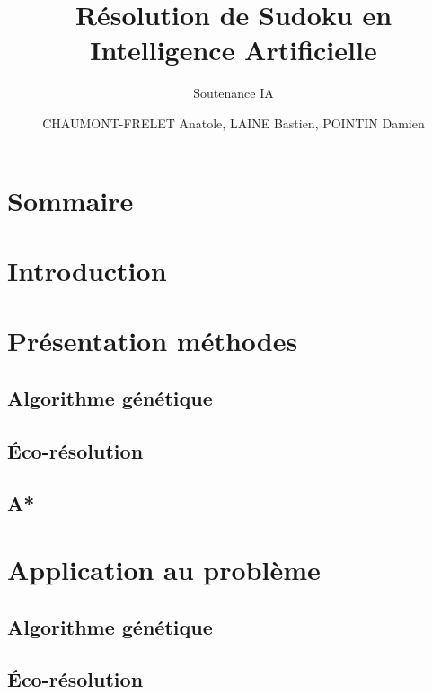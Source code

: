 \documentclass{beamer}
\title{Résolution de Sudoku en Intelligence Artificielle}
\subtitle{Soutenance IA}
\author{CHAUMONT-FRELET Anatole, LAINE Bastien, POINTIN Damien}
\institute{Génie Mathématique | INSA Rouen}
\begin{document}
    \beamertemplatenavigationsymbolsempty

    \begin{frame}
        \titlepage{}
    \end{frame}

    \section*{Sommaire}
        \begin{frame}
            \tableofcontents
        \end{frame}

    \section{Introduction}
        \subsection{}
            

    \section{Présentation méthodes}
        \subsection{Algorithme génétique}
            
        \subsection{Éco-résolution}
            
        \subsection{A*}
            
    \section{Application au problème}
        \subsection{Algorithme génétique}
            
        \subsection{Éco-résolution}
            
\end{document}
